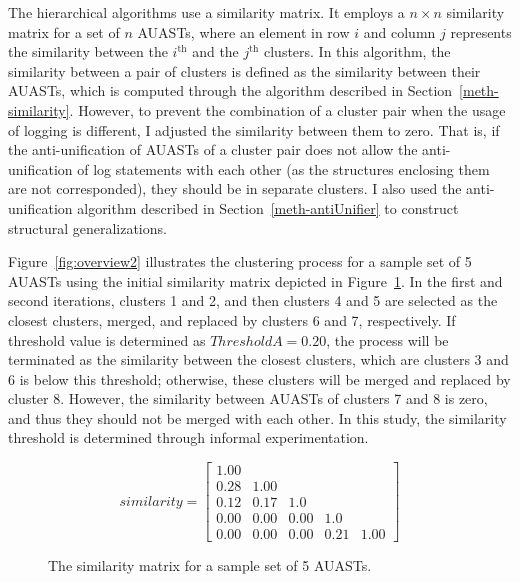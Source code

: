 The hierarchical algorithms use a similarity matrix. It employs a $n \times n$ similarity matrix for a set of $n$ AUASTs, where an element in row $i$ and column $j$ represents the similarity between the $i^{\text{th}}$ and the $j^{\text{th}}$ clusters. In this algorithm, the similarity between a pair of clusters is defined as the similarity between their AUASTs, which is computed through the algorithm described in Section~\ref{meth-similarity}. However, to prevent the combination of a cluster pair when the usage of logging is different, I adjusted the similarity between them to zero. That is, if the anti-unification of AUASTs of a cluster pair does not allow the anti-unification of log statements with each other (as the structures enclosing them are not corresponded), they should be in separate clusters. I also used the anti-unification algorithm described in Section~\ref{meth-antiUnifier} to construct structural generalizations.

Figure~\ref{fig:overview2} illustrates the clustering process for a sample set of 5 AUASTs using the initial similarity matrix depicted in Figure~\ref{matrix}. In the first and second iterations, clusters 1 and 2, and then clusters 4 and 5 are selected as the closest clusters, merged, and replaced by clusters 6 and 7, respectively. If threshold value is determined as $Threshold A = 0.20$, the process will be terminated as the similarity between the closest clusters, which are clusters 3 and 6 is below this threshold; otherwise, these clusters will be merged and replaced by cluster 8. However, the similarity between AUASTs of clusters 7 and 8 is zero, and thus they should not be merged with each other. In this study, the similarity threshold is determined through informal experimentation.


\begin{figure} [H]
\begin{displaymath}
    similarity = \left[
        \begin{matrix}
        1.00 &  &  &  &   \\
0.28 & 1.00 &  &  &  \\
0.12 & 0.17 & 1.0 &  &  \\
0.00 & 0.00 & 0.00 & 1.0 &  \\
0.00 & 0.00 & 0.00 & 0.21 & 1.00
        \end{matrix}   \right]
\end{displaymath}
 \caption{The similarity matrix for a sample set of 5 AUASTs.}
  \label{matrix}
\end{figure}




